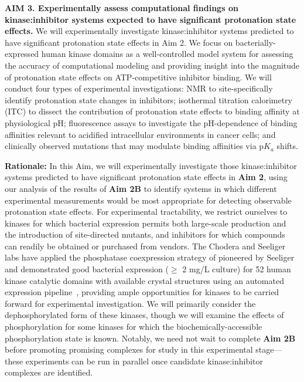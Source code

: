 \documentclass[11pt]{article}
\begin{document}

\begin{mdframed}[middlelinewidth=2pt]
{\bf AIM 3. Experimentally assess computational findings on kinase:inhibitor systems expected to have significant protonation state effects.}
We will experimentally investigate kinase:inhibitor systems predicted to have significant protonation state effects in Aim 2.
We focus on bacterially-expressed human kinase domains as a well-controlled model system for assessing the accuracy of computational modeling and providing insight into the magnitude of protonation state effects on ATP-competitive inhibitor binding.
We will conduct four types of experimental investigations: NMR to site-specifically identify protonation state changes in inhibitors; isothermal titration calorimetry (ITC) to dissect the contribution of protonation state effects to binding affinity at physiological pH; fluorescence assays to investigate the pH-dependence of binding affinities relevant to acidified intracellular environments in cancer cells; and clinically observed mutations that may modulate binding affinities via p$K_a$ shifts. 
\end{mdframed}

{\bf Rationale:}
In this Aim, we will experimentally investigate those kinase:inhibitor systems predicted to have significant protonation state effects in {\bf Aim 2}, using our analysis of the results of {\bf Aim 2B} to identify systems in which different experimental measurements would be most appropriate for detecting observable protonation state effects.
For experimental tractability, we restrict ourselves to kinases for which bacterial expression permits both large-scale production and the introduction of site-directed mutants, and inhibitors for which compounds can readily be obtained or purchased from vendors.
The Chodera and Seeliger labs have applied the phosphatase coexpression strategy of pioneered by Seeliger~\cite{seeliger:2005:protein-sci:kinase-expression} and demonstrated good bacterial expression ($\ge$ 2 mg/L culture) for 52 human kinase catalytic domains with available crystal structures using an automated expression pipeline~\cite{chodera:biorxiv:2016:kinome-bacterial-expression}, providing ample opportunities for kinases to be carried forward for experimental investigation.
We will primarily consider the dephosphorylated form of these kinases, though we will examine the effects of phosphorylation for some kinases for which the biochemically-accessible phosphorylation state is known.
Notably, we need not wait to complete {\bf Aim 2B} before promoting promising complexes for study in this experimental stage---these experiments can be run in parallel once candidate kinase:inhibitor complexes are identified.
\end{document}
